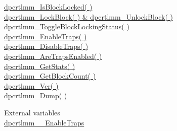 \documentclass{article}
\begin{document}
\href{#IsBlockLocked}{dpcrtlmm\_IsBlockLocked( )}
\\
\href{#LockBlock}{dpcrtlmm\_LockBlock( ) \& dpcrtlmm\_UnlockBlock(
)}
\\
\href{#ToggleBlockLockingStatus}{dpcrtlmm\_ToggleBlockLockingStatus(
)}
\\
\href{#EnableTraps}{dpcrtlmm\_EnableTraps( )}
\\
\href{#DisableTraps}{dpcrtlmm\_DisableTraps( )}
\\
\href{#AreTrapsEnabled}{dpcrtlmm\_AreTrapsEnabled( )}
\\
\href{#GetStats}{dpcrtlmm\_GetStats( )}
\\
\href{#GetBlockCount}{dpcrtlmm\_GetBlockCount( )}
\\
\href{#Ver}{dpcrtlmm\_Ver( )}
\\
\href{#Dump}{dpcrtlmm\_Dump( )}

\par External variables
\\
\href{#_EnableTraps}{dpcrtlmm\_\_EnableTraps}
\\
\end{document}

